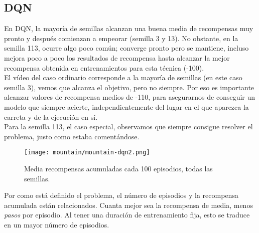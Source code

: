 \documentclass[11pt,fleqn]{book} %
\begin{document}
\subsection{DQN}

En DQN, la mayoría de semillas alcanzan una buena media de recompensas muy pronto y después comienzan a empeorar (semilla 3 y 13). No obstante, en la semilla 113, ocurre algo poco común; converge pronto pero se mantiene, incluso mejora poco a poco los resultados de recompensa hasta alcanzar la mejor recompensa obtenida en entrenamientos para esta técnica (-100). \\

El vídeo del caso ordinario corresponde a la mayoría de semillas (en este caso semilla 3), vemos que alcanza el objetivo, pero no siempre. Por eso es importante alcanzar valores de recompensa medios de -110, para asegurarnos de conseguir un modelo que siempre acierte, independientemente del lugar en el que aparezca la carreta y de la ejecución en sí. \\

Para la semilla 113, el caso especial, observamos que siempre consigue resolver el problema, justo como estaba comentándose.


\begin{figure}[H]
	\centering\texttt{[image: mountain/mountain-dqn2.png]}
	\caption{Media recompensas acumuladas cada 100 episodios, todas las semillas.}
	\label{fig:mountainDQN2} %
\end{figure} 

Por como está definido el problema, el número de episodios y la recompensa acumulada están relacionados. Cuanta mejor sea la recompensa de media, menos \textit{pasos} por episodio. Al tener una duración de entrenamiento fija, esto se traduce en un mayor número de episodios. \\
\end{document}
